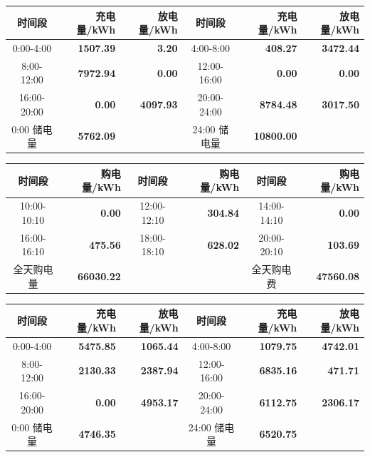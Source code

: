 {\begin{center}
\vspace{0.15\baselineskip}
\begin{tabular}{|c|r|r|c|r|r|}
\hline
时间段 & 充电量/kWh & 放电量/kWh & 时间段 & 充电量/kWh & 放电量/kWh \\
\hline
0:00-4:00 & \textbf{1507.39} & \textbf{3.20} & 4:00-8:00 & \textbf{408.27} & \textbf{3472.44} \\
\hline
8:00-12:00 & \textbf{7972.94} & \textbf{0.00} & 12:00-16:00 & \textbf{0.00} & \textbf{0.00} \\
\hline
16:00-20:00 & \textbf{0.00} & \textbf{4097.93} & 20:00-24:00 & \textbf{8784.48} & \textbf{3017.50} \\
\hline
0:00 储电量 & \textbf{5762.09} & & 24:00 储电量 & \textbf{10800.00} & \\
\hline
\end{tabular}
\par{}

\vspace{0.15\baselineskip}
\begin{tabular}{|c|r|c|r|c|r|}
\hline
时间段 & 购电量/kWh & 时间段 & 购电量/kWh & 时间段 & 购电量/kWh \\
\hline
10:00-10:10 & \textbf{0.00} & 12:00-12:10 & \textbf{304.84} & 14:00-14:10 & \textbf{0.00} \\
\hline
16:00-16:10 & \textbf{475.56} & 18:00-18:10 & \textbf{628.02} & 20:00-20:10 & \textbf{103.69} \\
\hline
全天购电量 & \textbf{66030.22} & & & 全天购电费 & \textbf{47560.08} \\
\hline
\end{tabular}
\par{}

\vspace{0.15\baselineskip}
\begin{tabular}{|c|r|r|c|r|r|}
\hline
时间段 & 充电量/kWh & 放电量/kWh & 时间段 & 充电量/kWh & 放电量/kWh \\
\hline
0:00-4:00 & \textbf{5475.85} & \textbf{1065.44} & 4:00-8:00 & \textbf{1079.75} & \textbf{4742.01} \\
\hline
8:00-12:00 & \textbf{2130.33} & \textbf{2387.94} & 12:00-16:00 & \textbf{6835.16} & \textbf{471.71} \\
\hline
16:00-20:00 & \textbf{0.00} & \textbf{4953.17} & 20:00-24:00 & \textbf{6112.75} & \textbf{2306.17} \\
\hline
0:00 储电量 & \textbf{4746.35} & & 24:00 储电量 & \textbf{6520.75} & \\
\hline
\end{tabular}
\par{}


\end{center}}
